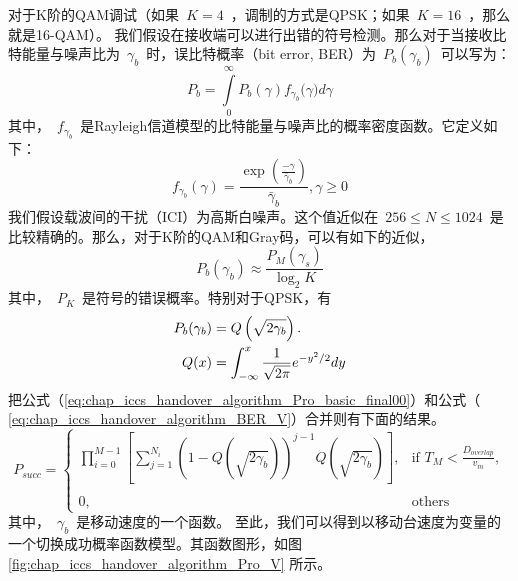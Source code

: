 对于K阶的QAM调试（如果~$K=4$~，调制的方式是QPSK；如果~$K=16$~，那么就是16-QAM）。
我们假设在接收端可以进行出错的符号检测。那么对于当接收比特能量与噪声比为~$\gamma_b$~时，误比特概率（bit error, BER）为~$P_b(\gamma_b)$~可以写为：
\[
{{P}_{b}}=\int\limits_{0}^{\infty }{{{P}_{b}}(\gamma ){{f}_{{{\gamma }_{b}}}}(}\gamma )d\gamma
\]
其中，~$f_{\gamma_b}$~是Rayleigh信道模型的比特能量与噪声比的概率密度函数。它定义如下：
\[{{f}_{{{\gamma }_{b}}}}(\gamma )=\frac{\exp (\frac{-\gamma }{{{{\bar{\gamma }}}_{b}}})}{{{{\bar{\gamma }}}_{b}}},\gamma \ge 0\]
我们假设载波间的干扰（ICI）为高斯白噪声。这个值近似在~$256 \le N \le 1024$~是比较精确的\cite{Leung:WCNC2005}。那么，对于K阶的QAM和Gray码，可以有如下的近似，
\begin{equation}
P_b(\gamma_b) \approx \frac{P_M(\gamma_s)}{\log_2 K}
\end{equation}
其中，~$P_K$~是符号的错误概率。特别对于QPSK，有
\begin{align}
\label{eq:chap_iccs_handover_algorithm_BER_V}
P_{b}(\gamma_{b})&= Q\left(\sqrt{2\gamma_{b}}\right).\\
Q(x) &= \int^x_{-\infty} \frac{1}{\sqrt{2\pi}}e^{-y^2/2}dy \notag
\end{align}
把公式（\ref{eq:chap_iccs_handover_algorithm_Pro_basic_final00}）和公式（ \ref{eq:chap_iccs_handover_algorithm_BER_V}）合并则有下面的结果。
\begin{equation}
P_{succ}=\left\{
\begin{array}{ll}
\prod_{i=0}^{M-1}\left[\sum_{j=1}^{N_{i}}(1-Q\left(\sqrt{2\gamma_{b}}\right))^{j-1}Q\left(\sqrt{2\gamma_{b}}\right)\right],
& \mbox{if }T_{M}<\frac{D_{overlap}}{v_{m}},\\
\\0, & \mbox{others}
\end{array}\right.\label{eq:chap_handover:velocity_bit_error_rate}
\end{equation}
其中，~$\gamma_b$~是移动速度的一个函数。
至此，我们可以得到以移动台速度为变量的一个切换成功概率函数模型。其函数图形，如图\ref{fig:chap_iccs_handover_algorithm_Pro_V} 所示。
